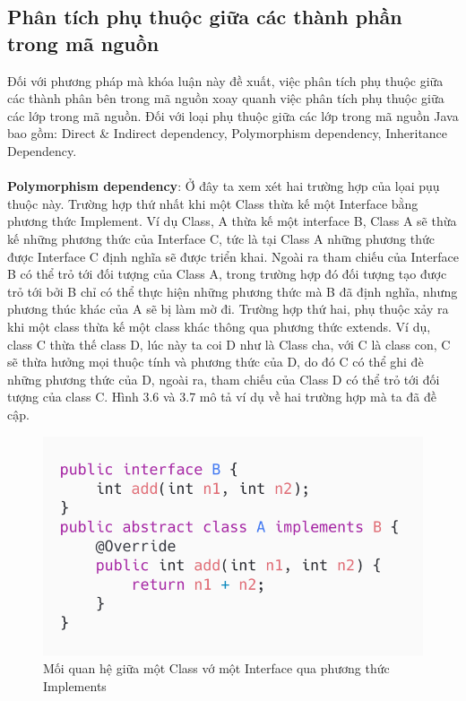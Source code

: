 \documentclass[12pt]{report}
\begin{document}
\subsection{Phân tích phụ thuộc giữa các thành phần trong mã nguồn}
Đối với phương pháp mà khóa luận này đề xuất, việc phân tích phụ thuộc giữa các thành phân bên trong mã nguồn xoay quanh việc phân tích phụ thuộc giữa các lớp trong mã nguồn. Đối với loại phụ thuộc giữa các lớp trong mã nguồn Java bao gồm: Direct \& Indirect dependency, Polymorphism dependency, Inheritance Dependency.\\\\
\textbf{Polymorphism dependency}: Ở đây ta xem xét hai trường hợp của lọai pụụ thuộc này. Trường hợp thứ nhất khi một Class thừa kế một Interface bằng phương thức Implement. Ví dụ Class, A  thừa kế một interface B, Class A sẽ thừa kế những phương thức của Interface C, tức là tại Class A những phương thức được Interface C định nghĩa sẽ được triển khai. Ngoài ra tham chiếu của Interface B có thể trỏ tới đối tượng của Class A, trong trường hợp đó đối tượng tạo được trỏ tới bởi B chỉ có thể thực hiện những phương thức mà B đã định nghĩa, nhưng phương thúc khác của A sẽ bị làm mờ đi. Trường hợp thứ hai, phụ thuộc xảy ra khi một class thừa kế một class khác thông qua phương thức extends. Ví dụ, class C thừa thế class D, lúc này ta coi D như là Class cha, với C là class con, C sẽ thừa hưởng mọi thuộc tính và phương thức của  D, do đó C có thể ghi đè những phương thức của D, ngoài ra, tham chiếu của Class D có thể trỏ tới đối tượng của class C. Hình 3.6 và 3.7 mô tả ví dụ về hai trường hợp mà ta đã đề cập.
\begin{figure}[!htbp]
	\vspace*{-2cm}
	\centering
	\includegraphics[scale=0.5]{images/AimplementsB}
	\caption{Mối quan hệ giữa một Class vớ một Interface qua phương thức Implements}
	\label{fig:A_implemets_B}
\end{figure}
\end{document}
